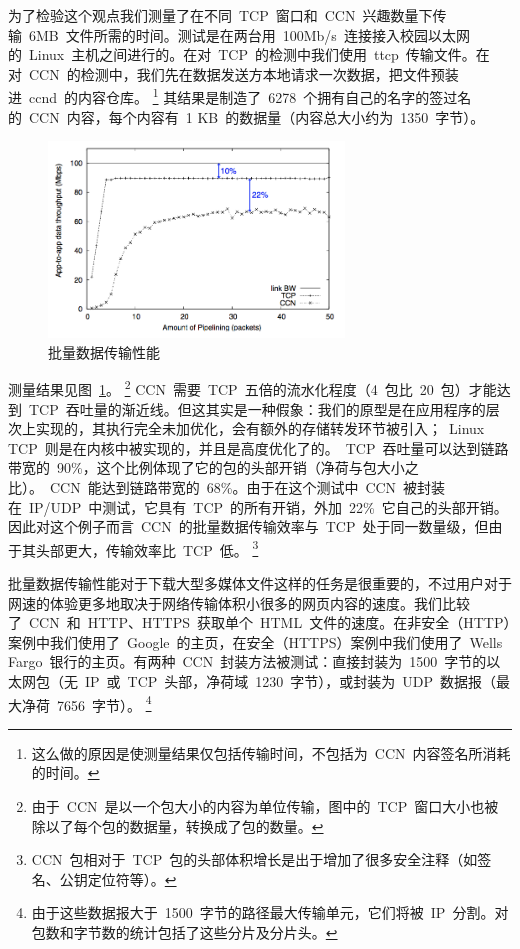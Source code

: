 为了检验这个观点我们测量了在不同~TCP~窗口和~CCN~兴趣数量下传输~6MB~文件所需的时间。测试是在两台用~100Mb/s~连接接入校园以太网的~Linux~主机之间进行的。在对~TCP~的检测中我们使用~ttcp~传输文件。在对~CCN~的检测中，我们先在数据发送方本地请求一次数据，把文件预装进~ccnd~的内容仓库。
\renewcommand\baselinestretch{1} %
\footnote{这么做的原因是使测量结果仅包括传输时间，不包括为~CCN~内容签名所消耗的时间。}
其结果是制造了~6278~个拥有自己的名字的签过名的~CCN~内容，每个内容有~1 KB~的数据量（内容总大小约为~1350~字节）。

\begin{figure}[htbp]
\begin{center}
\includegraphics[width=0.7\textwidth]{images/performance}
\caption{批量数据传输性能}
\label{performance}
\end{center}
\end{figure}

测量结果见图~\ref{performance}。
\renewcommand\baselinestretch{1} %
\footnote{由于~CCN~是以一个包大小的内容为单位传输，图中的~TCP~窗口大小也被除以了每个包的数据量，转换成了包的数量。}
CCN~需要~TCP~五倍的流水化程度（4~包比~20~包）才能达到~TCP~吞吐量的渐近线。但这其实是一种假象：我们的原型是在应用程序的层次上实现的，其执行完全未加优化，会有额外的存储转发环节被引入；~Linux TCP~则是在内核中被实现的，并且是高度优化了的。~TCP~吞吐量可以达到链路带宽的~90\%，这个比例体现了它的包的头部开销（净荷与包大小之比）。~CCN~能达到链路带宽的~68\%。由于在这个测试中~CCN~被封装在~IP/UDP~中测试，它具有~TCP~的所有开销，外加~22\%~它自己的头部开销。因此对这个例子而言~CCN~的批量数据传输效率与~TCP~处于同一数量级，但由于其头部更大，传输效率比~TCP~低。
\renewcommand\baselinestretch{1} %
\footnote{CCN~包相对于~TCP~包的头部体积增长是出于增加了很多安全注释（如签名、公钥定位符等）。}

批量数据传输性能对于下载大型多媒体文件这样的任务是很重要的，不过用户对于网速的体验更多地取决于网络传输体积小很多的网页内容的速度。我们比较了~CCN~和~HTTP、HTTPS~获取单个~HTML~文件的速度。在非安全（HTTP）案例中我们使用了~Google~的主页，在安全（HTTPS）案例中我们使用了~Wells Fargo~银行的主页。有两种~CCN~封装方法被测试：直接封装为~1500~字节的以太网包（无~IP~或~TCP~头部，净荷域~1230~字节），或封装为~UDP~数据报（最大净荷~7656~字节）。
\renewcommand\baselinestretch{1} %
\footnote{由于这些数据报大于~1500~字节的路径最大传输单元，它们将被~IP~分割。对包数和字节数的统计包括了这些分片及分片头。}


